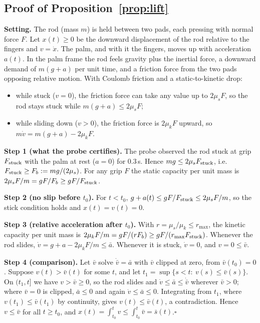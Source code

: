 \subsection{Proof of Proposition~\ref{prop:lift}}\label{app:proofprop}
\textbf{Setting.} The rod (mass $m$) is held between two pads, each pressing with normal force $F$. Let $x(t)\ge0$ be the
downward displacement of the rod relative to the fingers and $v=\dot x$. The palm, and with it the fingers, moves up with
acceleration $a(t)$. In the palm frame the rod feels gravity plus the inertial force, a downward demand of $m(g+a)$ per
unit time, and a friction force from the two pads opposing relative motion. With Coulomb friction and a static-to-kinetic
drop:
\begin{itemize}
\item while stuck ($v=0$), the friction force can take any value up to $2\mu_sF$, so the rod stays stuck while
$m(g+a)\le2\mu_sF$;
\item while sliding down ($v>0$), the friction force is $2\mu_kF$ upward, so $m\dot v=m(g+a)-2\mu_kF$.
\end{itemize}
\textbf{Step 1 (what the probe certifies).} The probe observed the rod stuck at grip $F_{\mathrm{stuck}}$ with the palm at rest ($a=0$)
for 0.3\,s. Hence $mg\le2\mu_sF_{\mathrm{stuck}}$, i.e.\ $F_{\mathrm{stuck}}\ge F_b:=mg/(2\mu_s)$. For any grip $F$ the static capacity per unit mass is
$2\mu_sF/m=gF/F_b\ge gF/F_{\mathrm{stuck}}$.

\textbf{Step 2 (no slip before $t_0$).} For $t<t_0$, $g+a(t)\le gF/F_{\mathrm{stuck}}\le2\mu_sF/m$, so the stick condition holds and
$x(t)=v(t)=0$.

\textbf{Step 3 (relative acceleration after $t_0$).} With $r=\mu_s/\mu_k\le r_{\max}$, the kinetic capacity per unit mass is
$2\mu_kF/m=gF/(rF_b)\ge gF/(r_{\max}F_{\mathrm{stuck}})$. Whenever the rod slides, $\dot v=g+a-2\mu_kF/m\le\bar a$. Whenever it is stuck,
$\dot v=0$, and $v=0\le\bar v$.

\textbf{Step 4 (comparison).} Let $\bar v$ solve $\dot{\bar v}=\bar a$ with $\bar v$ clipped at zero, from $\bar v(t_0)=0$.
Suppose $v(t)>\bar v(t)$ for some $t$, and let $t_1=\sup\{s<t:\ v(s)\le\bar v(s)\}$. On $(t_1,t]$ we have $v>\bar v\ge0$, so the
rod slides and $\dot v\le\bar a\le\dot{\bar v}$ wherever $\bar v>0$; where $\bar v=0$ is clipped, $\bar a\le0$ and again
$\dot v\le\bar a\le0$. Integrating from $t_1$, where $v(t_1)\le\bar v(t_1)$ by continuity, gives $v(t)\le\bar v(t)$, a
contradiction. Hence $v\le\bar v$ for all $t\ge t_0$, and $x(t)=\int_{t_0}^t v\le\int_{t_0}^t\bar v=\bar s(t)$.\hfill$\square$


